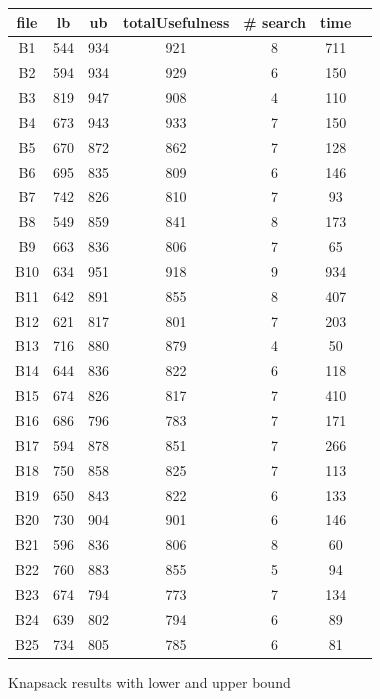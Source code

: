 \documentclass[a4paper ,12pt,french]{article}
\begin{document}
\begin{figure}[!h]
\begin{tabular}{|c|c|c|c|c|c|c|}
\hline
file&lb&ub&totalUsefulness&\# search&time\\
\hline
\hline

B1&544&934&921&8&711\\\hline
B2&594&934&929&6&150\\\hline
B3&819&947&908&4&110\\\hline
B4&673&943&933&7&150\\\hline
B5&670&872&862&7&128\\\hline
B6&695&835&809&6&146\\\hline
B7&742&826&810&7&93\\\hline
B8&549&859&841&8&173\\\hline
B9&663&836&806&7&65\\\hline
B10&634&951&918&9&934\\\hline
B11&642&891&855&8&407\\\hline
B12&621&817&801&7&203\\\hline
B13&716&880&879&4&50\\\hline
B14&644&836&822&6&118\\\hline
B15&674&826&817&7&410\\\hline
B16&686&796&783&7&171\\\hline
B17&594&878&851&7&266\\\hline
B18&750&858&825&7&113\\\hline
B19&650&843&822&6&133\\\hline
B20&730&904&901&6&146\\\hline
B21&596&836&806&8&60\\\hline
B22&760&883&855&5&94\\\hline
B23&674&794&773&7&134\\\hline
B24&639&802&794&6&89\\\hline
B25&734&805&785&6&81\\\hline


\end{tabular}
\caption{Knapsack results with lower and upper bound}
\label{LUB}
\end{figure}
\end{document}
